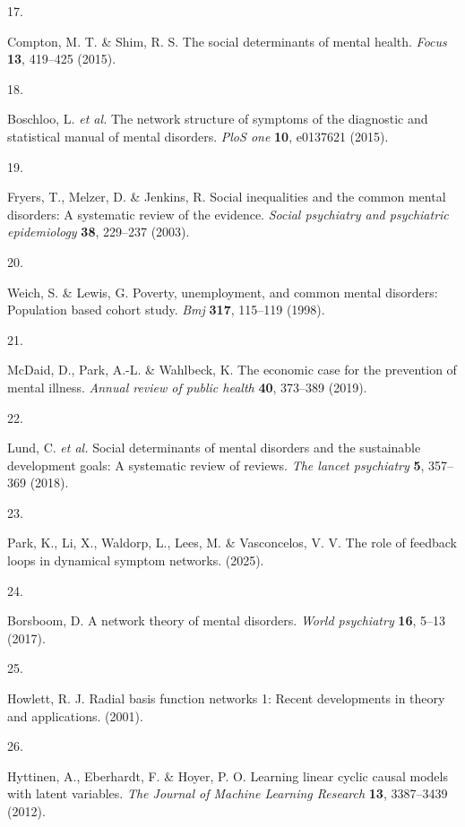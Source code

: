\documentclass[
]{article}
\newlength{\cslhangindent}
\newlength{\csllabelwidth}
\newenvironment{CSLReferences}[2] %
 {\begin{list}{}{%
  \setlength{\itemindent}{0pt}
  \setlength{\leftmargin}{0pt}
  \setlength{\parsep}{0pt}
  \ifodd #1
   \setlength{\leftmargin}{\cslhangindent}
   \setlength{\itemindent}{-1\cslhangindent}
  \fi
  \setlength{\itemsep}{#2\baselineskip}}}
 {\end{list}}
\newcommand{\CSLLeftMargin}[1]{\parbox[t]{\csllabelwidth}{\strut#1\strut}}
\newcommand{\CSLRightInline}[1]{\parbox[t]{\linewidth - \csllabelwidth}{\strut#1\strut}}
\begin{document}
\begin{CSLReferences}{0}{0}
\CSLLeftMargin{17. }%
\CSLRightInline{Compton, M. T. \& Shim, R. S. The social determinants of
mental health. \emph{Focus} \textbf{13}, 419--425 (2015).}

\CSLLeftMargin{18. }%
\CSLRightInline{Boschloo, L. \emph{et al.} The network structure of
symptoms of the diagnostic and statistical manual of mental disorders.
\emph{PloS one} \textbf{10}, e0137621 (2015).}

\CSLLeftMargin{19. }%
\CSLRightInline{Fryers, T., Melzer, D. \& Jenkins, R. Social
inequalities and the common mental disorders: A systematic review of the
evidence. \emph{Social psychiatry and psychiatric epidemiology}
\textbf{38}, 229--237 (2003).}

\CSLLeftMargin{20. }%
\CSLRightInline{Weich, S. \& Lewis, G. Poverty, unemployment, and common
mental disorders: Population based cohort study. \emph{Bmj}
\textbf{317}, 115--119 (1998).}

\CSLLeftMargin{21. }%
\CSLRightInline{McDaid, D., Park, A.-L. \& Wahlbeck, K. The economic
case for the prevention of mental illness. \emph{Annual review of public
health} \textbf{40}, 373--389 (2019).}

\CSLLeftMargin{22. }%
\CSLRightInline{Lund, C. \emph{et al.} Social determinants of mental
disorders and the sustainable development goals: A systematic review of
reviews. \emph{The lancet psychiatry} \textbf{5}, 357--369 (2018).}

\CSLLeftMargin{23. }%
\CSLRightInline{Park, K., Li, X., Waldorp, L., Lees, M. \& Vasconcelos,
V. V. The role of feedback loops in dynamical symptom networks. (2025).}

\CSLLeftMargin{24. }%
\CSLRightInline{Borsboom, D. A network theory of mental disorders.
\emph{World psychiatry} \textbf{16}, 5--13 (2017).}

\CSLLeftMargin{25. }%
\CSLRightInline{Howlett, R. J. Radial basis function networks 1: Recent
developments in theory and applications. (2001).}

\CSLLeftMargin{26. }%
\CSLRightInline{Hyttinen, A., Eberhardt, F. \& Hoyer, P. O. Learning
linear cyclic causal models with latent variables. \emph{The Journal of
Machine Learning Research} \textbf{13}, 3387--3439 (2012).}


\end{CSLReferences}
\end{document}

